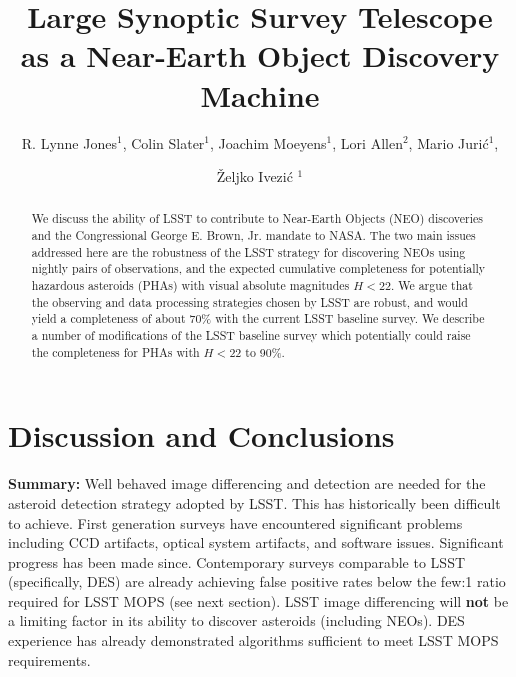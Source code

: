\documentclass[12pt,preprint]{aastex}
\begin{document}
\title{Large Synoptic Survey Telescope as a Near-Earth Object Discovery Machine}

\author{R. Lynne Jones$^1$, Colin Slater$^1$, Joachim Moeyens$^1$, 
Lori Allen$^2$, Mario Juri\'{c}$^1$,  \and \v{Z}eljko Ivezi\'{c} $^1$}


\begin{abstract}
We discuss the ability of LSST to contribute to Near-Earth Objects (NEO) discoveries and
the Congressional George E. Brown, Jr. mandate to NASA. The two main issues addressed 
here are the robustness of the LSST strategy for discovering NEOs using nightly pairs of 
observations, and the expected cumulative completeness for potentially hazardous asteroids
(PHAs) with visual absolute magnitudes $H<22$.  We argue that the observing and data 
processing strategies chosen by LSST are robust, and would yield a completeness of about 
70\% with the current LSST baseline survey. We describe a number of modifications of the 
LSST baseline survey which potentially could raise the completeness for PHAs with $H<22$
to 90\%. 
\end{abstract}

\keywords{}

 

 



 




\section{Discussion and Conclusions}


{\bf Summary:} Well behaved image differencing and detection are needed for the
asteroid detection strategy adopted by LSST. This has historically
been difficult to achieve. First generation surveys have encountered
significant problems including CCD artifacts, optical system
artifacts, and software issues. Significant progress has been made
since. Contemporary surveys comparable to LSST (specifically, DES) are
already achieving false positive rates below the few:1 ratio required
for LSST MOPS (see next section). LSST image differencing will {\bf
not} be a limiting factor in its ability to discover asteroids
(including NEOs). DES experience has already demonstrated algorithms 
sufficient to meet LSST MOPS requirements.
\end{document}
